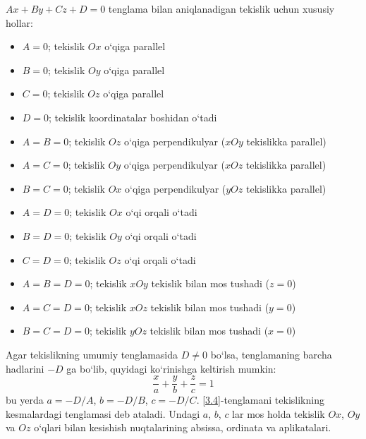 $Ax+By+Cz+D=0$ tenglama bilan aniqlanadigan tekislik uchun xususiy hollar:
\begin{itemize}
	\item $A=0$; tekislik $Ox$ o`qiga parallel
	\item $B=0$; tekislik $Oy$ o`qiga parallel
	\item $C=0$; tekislik $Oz$ o`qiga parallel
	\item $D=0$; tekislik koordinatalar boshidan o`tadi
	\item $A=B=0$; tekislik $Oz$ o`qiga perpendikulyar ($xOy$ tekislikka parallel)
	\item $A=C=0$; tekislik $Oy$ o`qiga perpendikulyar ($xOz$ tekislikka parallel)
	\item $B=C=0$; tekislik $Ox$ o`qiga perpendikulyar ($yOz$ tekislikka parallel)
	\item $A=D=0$; tekislik $Ox$ o`qi orqali o`tadi
	\item $B=D=0$; tekislik $Oy$ o`qi orqali o`tadi
	\item $C=D=0$; tekislik $Oz$ o`qi orqali o`tadi
	\item $A=B=D=0$; tekislik $xOy$ tekislik bilan mos tushadi ($z=0$)
	\item $A=C=D=0$; tekislik $xOz$ tekislik bilan mos tushadi ($y=0$)
	\item $B=C=D=0$; tekislik $yOz$ tekislik bilan mos tushadi ($x=0$)
\end{itemize}
Agar tekislikning umumiy tenglamasida $D\ne0$ bo`lsa, tenglamaning barcha hadlarini $-D$ ga bo`lib, quyidagi ko`rinishga keltirish mumkin:
\begin{equation}
	\frac{x}{a}+\frac{y}{b}+\frac{z}{c}=1
	\label{3.4}
\end{equation}
bu yerda $a=-D/A$, $b=-D/B$, $c=-D/C$. \eqref{3.4}-tenglamani tekislikning kesmalardagi tenglamasi deb ataladi. Undagi $a$, $b$, $c$ lar mos holda tekislik $Ox$, $Oy$ va $Oz$ o`qlari bilan kesishish nuqtalarining absissa, ordinata va aplikatalari.



